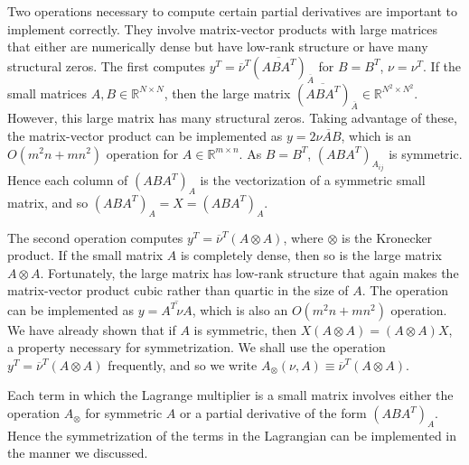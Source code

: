 \documentclass[10pt,fleqn]{article}
\renewcommand{\vec}[1]{\ensuremath{\overline{#1}}}
\begin{document}
Two operations necessary to compute certain partial derivatives are important to
implement correctly. They involve matrix-vector products with large matrices
that either are numerically dense but have low-rank structure or have many
structural zeros. The first computes $y^T = \vec\nu^T (\vec{A B A^T})_{\vec A}$
for $B = B^T$, $\nu = \nu^T$. If the small matrices $A, B \in \mathbb{R}^{N
  \times N}$, then the large matrix $(\vec{A B A^T})_{\vec A} \in
\mathbb{R}^{N^2 \times N^2}$. However, this large matrix has many structural
zeros. Taking advantage of these, the matrix-vector product can be implemented
as $y = 2 \vec{\nu A B}$, which is an $O(m^2 n + m n^2)$ operation for $A \in
\mathbb{R}^{m \times n}$. As $B = B^T$, $(A B A^T)_{A_{ij}}$ is symmetric. Hence
each column of $(A B A^T)_A$ is the vectorization of a symmetric small matrix,
and so $(A B A^T)_A = X = (A B A^T)_A$.

The second operation computes $y^T = \vec\nu^T (A \otimes A)$, where $\otimes$
is the Kronecker product. If the small matrix $A$ is completely dense, then so
is the large matrix $A \otimes A$. Fortunately, the large matrix has low-rank
structure that again makes the matrix-vector product cubic rather than quartic
in the size of $A$. The operation can be implemented as $y = \vec{A^T \nu A}$,
which is also an $O(m^2 n + m n^2)$ operation. We have already shown that if $A$
is symmetric, then $X (A \otimes A) = (A \otimes A) X$, a property necessary for
symmetrization. We shall use the operation $y^T = \vec\nu^T (A \otimes A)$
frequently, and so we write $A_{\otimes}(\nu, A) \equiv \vec\nu^T (A \otimes
A)$.

Each term in which the Lagrange multiplier is a small matrix involves either the
operation $A_{\otimes}$ for symmetric $A$ or a partial derivative of the form
$(A B A^T)_A$. Hence the symmetrization of the terms in the Lagrangian can be
implemented in the manner we discussed.
\end{document}
